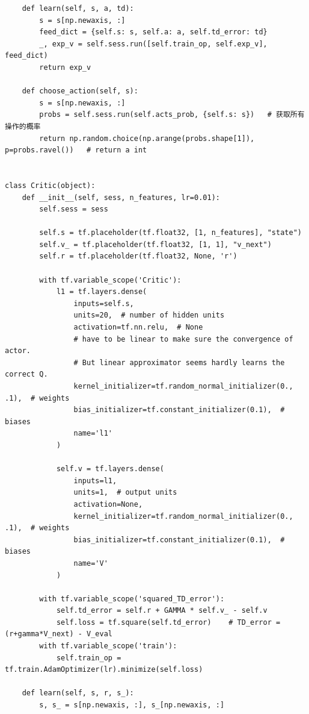 \documentclass{book}
\begin{document}
\begin{lstlisting}
    def learn(self, s, a, td):
        s = s[np.newaxis, :]
        feed_dict = {self.s: s, self.a: a, self.td_error: td}
        _, exp_v = self.sess.run([self.train_op, self.exp_v], feed_dict)
        return exp_v

    def choose_action(self, s):
        s = s[np.newaxis, :]
        probs = self.sess.run(self.acts_prob, {self.s: s})   # 获取所有操作的概率
        return np.random.choice(np.arange(probs.shape[1]), p=probs.ravel())   # return a int


class Critic(object):
    def __init__(self, sess, n_features, lr=0.01):
        self.sess = sess

        self.s = tf.placeholder(tf.float32, [1, n_features], "state")
        self.v_ = tf.placeholder(tf.float32, [1, 1], "v_next")
        self.r = tf.placeholder(tf.float32, None, 'r')

        with tf.variable_scope('Critic'):
            l1 = tf.layers.dense(
                inputs=self.s,
                units=20,  # number of hidden units
                activation=tf.nn.relu,  # None
                # have to be linear to make sure the convergence of actor.
                # But linear approximator seems hardly learns the correct Q.
                kernel_initializer=tf.random_normal_initializer(0., .1),  # weights
                bias_initializer=tf.constant_initializer(0.1),  # biases
                name='l1'
            )

            self.v = tf.layers.dense(
                inputs=l1,
                units=1,  # output units
                activation=None,
                kernel_initializer=tf.random_normal_initializer(0., .1),  # weights
                bias_initializer=tf.constant_initializer(0.1),  # biases
                name='V'
            )

        with tf.variable_scope('squared_TD_error'):
            self.td_error = self.r + GAMMA * self.v_ - self.v
            self.loss = tf.square(self.td_error)    # TD_error = (r+gamma*V_next) - V_eval
        with tf.variable_scope('train'):
            self.train_op = tf.train.AdamOptimizer(lr).minimize(self.loss)

    def learn(self, s, r, s_):
        s, s_ = s[np.newaxis, :], s_[np.newaxis, :]


\end{lstlisting}
\end{document}
